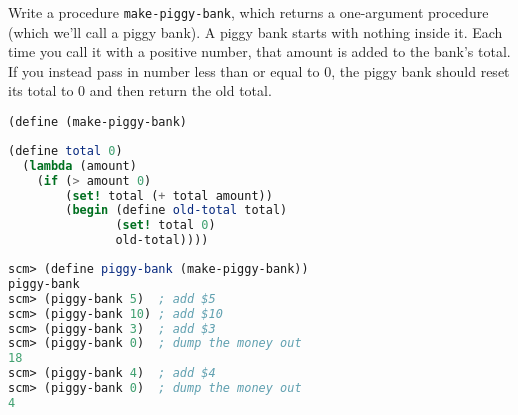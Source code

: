 \question Write a procedure \lstinline$make-piggy-bank$, which returns a
one-argument procedure (which we'll call a piggy bank). A piggy bank starts with
nothing inside it. Each time you call it with a positive number, that amount is
added to the bank's total. If you instead pass in number less than or equal to
0, the piggy bank should reset its total to 0 and then return the old total.

\begin{lstlisting}[language=Scheme]
(define (make-piggy-bank)
\end{lstlisting}
\begin{solution}[4in]
\begin{lstlisting}[language=Scheme]
  (define total 0)
  (lambda (amount)
    (if (> amount 0)
        (set! total (+ total amount))
        (begin (define old-total total)
			   (set! total 0)
               old-total))))
\end{lstlisting}
\end{solution}
\begin{lstlisting}[language=Scheme]
scm> (define piggy-bank (make-piggy-bank))
piggy-bank
scm> (piggy-bank 5)  ; add $5
scm> (piggy-bank 10) ; add $10
scm> (piggy-bank 3)  ; add $3
scm> (piggy-bank 0)  ; dump the money out
18
scm> (piggy-bank 4)  ; add $4
scm> (piggy-bank 0)  ; dump the money out
4
\end{lstlisting}
